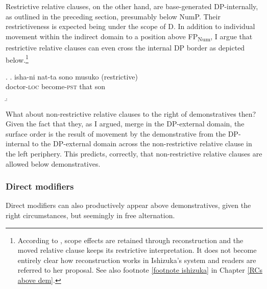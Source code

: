 \documentclass [output=book,colorlinks,citecolor=brown]{langscibook}
\begin{document}
Restrictive relative clauses, on the other hand, are base-generated DP-internally, as outlined in the preceding section, presumably below NumP. Their restrictiveness is expected being under the scope of D. In addition to individual movement within the indirect domain to a position above FP\textsubscript{Num}, I argue that restrictive relative clauses can even cross the internal DP border as depicted below.\footnote{According to \citet{ishizuka:2008:RC}, scope effects are retained through reconstruction and the moved relative clause keeps its restrictive interpretation. It does not become entirely clear how reconstruction works in Ishizuka's system and readers are referred to her proposal. See also footnote \ref{footnote ishizuka} in Chapter \ref{RCs above dem}.}

\newpage

 \ex. \ag. isha-ni nat-ta sono musuko (restrictive)\\
doctor-\textsc{loc} become-\textsc{pst} that son\\
 \b. 

What about non-restrictive relative clauses to the right of demonstratives then? Given the fact that they, as I argued, merge in the DP-external domain, the surface order is the result of movement by the demonstrative from the DP-internal to the DP-external domain across the non-restrictive relative clause in the left periphery. This predicts, correctly, that non-restrictive relative clauses are allowed below demonstratives.

\subsubsection{Direct modifiers }

Direct modifiers can also productively appear above demonstratives, given the right circumstances, but seemingly in free alternation. %
\end{document}
